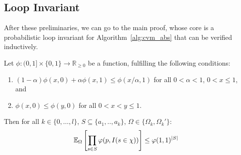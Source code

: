 \subsection{Loop Invariant}
After these preliminaries, we can go to the main proof, whose core is a probabilistic loop
invariant for Algorithm~\ref{alg:cvm_abs} that can be verified inductively.

\begin{lemma}
\label{le:prob_invariant}
Let $\phi : (0,1] \times \{0,1\} \rightarrow \mathbb R_{\geq 0}$ be a function, fulfilling the following
  conditions:
\begin{enumerate}
\item \label{cond:phi_1} $(1-\alpha) \phi(x,0) + \alpha \phi(x,1) \leq \phi(x/\alpha,1)$ for all
  $0 < \alpha < 1$, $0 < x \leq 1$, and
\item \label{cond:phi_2} $\phi(x,0) \leq \phi(y,0)$ for all $0 < x < y \leq 1$.
\end{enumerate}
Then for all 
$k \in \{0,\ldots,l\}$, $S \subseteq \{a_1,..,a_k\}$, $\Omega \in \{\Omega_k,\Omega_k'\}$:
\[
  \operatorname{\mathbb E}_{\Omega}\left[ \prod_{s \in S} \varphi(p, I(s \in \chi)) \right] \leq \varphi(1,1)^{|S|} 
\]
\end{lemma}
